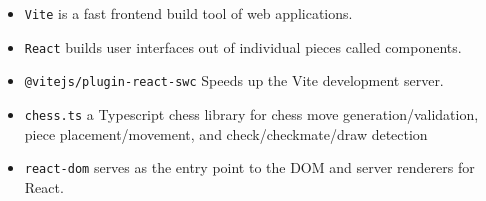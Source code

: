 \begin{itemize}
    \item \texttt{Vite} is a fast frontend build tool of web applications. \cite{ts:vite}
    
    \item \texttt{React} builds user interfaces out of individual pieces called components. \cite{ts:react}
    
    \item \texttt{@vitejs/plugin-react-swc} Speeds up the Vite development server. \cite{ts:swc}
    
    \item \texttt{chess.ts} a Typescript chess library for chess move generation/validation, piece placement/movement, and check/checkmate/draw detection \cite{ts:chess}
    
    \item \texttt{react-dom} serves as the entry point to the DOM and server renderers for React. \cite{ts:react-dom}
\end{itemize}